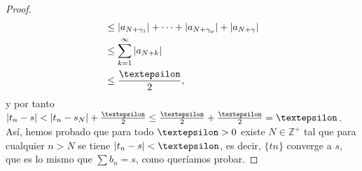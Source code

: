 \begin{proof}
$$\begin{aligned}
  & \leq\left|a_{N+\gamma_{1}}\right|+\cdots+\left|a_{N+\gamma_{\omega}}\right|+\left|a_{N+\gamma}\right| \\
  & \leq \sum_{k=1}^{\infty}\left|a_{N+k}\right| \\
  & \leq \frac{\text{\textepsilon}}{2},
  \end{aligned}
  $$
  y por tanto $\left|t_{n}-s\right|<\left|t_{n}-s_{N}\right|+\frac{\text{\textepsilon}}{2} \leq \frac{\text{\textepsilon}}{2}+\frac{\text{\textepsilon}}{2}=\text{\textepsilon}$. Así, hemos probado que para todo $\text{\textepsilon}>0$ existe $N \in \mathbb{Z}^{+}$ tal que para cualquier $n>N$ se tiene $\left|t_{n}-s\right|<\text{\textepsilon}$, es decir, $\{tn\}$ converge a $s$, que es lo mismo que $\sum b_{n}=s$, como queríamos probar.
\end{proof}

